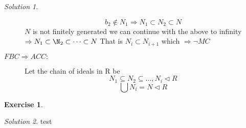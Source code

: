 \documentclass[a4paper,twoside=false,abstract=false,numbers=noenddot,
titlepage=false,headings=small,parskip=half,version=last]{scrartcl}
\theoremstyle{definition}
\newtheorem{exercise}{Exercise}
\theoremstyle{remark}
\newtheorem*{solution}{Solution}
\begin{document}
\begin{solution}
\begin{description}
\begin{equation}
            b_2 \notin N_1 \Rightarrow N_1 \subset N_2 \subset N
        \end{equation}
        $N$ is not finitely generated we can continue with the above to
        infinity $\Rightarrow N_1 \subset \N_2 \subset \dots \subset N$
        That is $N_i \subset N_{i+1}$ which $\Rightarrow \lnot{MC}$
    \item[$FBC\Rightarrow ACC:$]
        Let the chain of ideals in R be
        \begin{equation}
            N_1 \subseteq N_2 \subseteq \dots, N_i \lhd R
        \end{equation}
        \begin{equation}
            \bigcup{N_i}=N\lhd R
        \end{equation}


\end{description}

\end{solution}

\begin{exercise}
{\bf
}
\end{exercise}
\begin{solution}
test
\end{solution}

\end{document}
